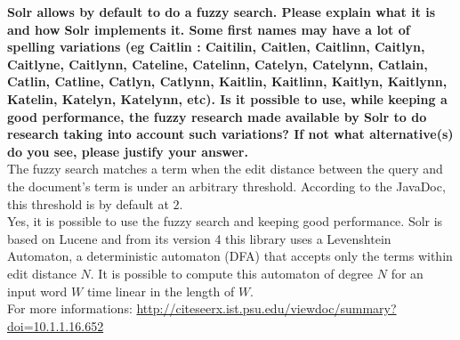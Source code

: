 \documentclass[a4paper]{article}
\begin{document}
\textbf{Solr allows by default to do a fuzzy search. Please explain what it is and how Solr implements it. Some first names may have a lot of spelling variations (eg Caitlin : Caitilin, Caitlen, Caitlinn, Caitlyn, Caitlyne, Caitlynn, Cateline, Catelinn, Catelyn, Catelynn, Catlain, Catlin, Catline, Catlyn, Catlynn, Kaitlin, Kaitlinn, Kaitlyn, Kaitlynn, Katelin, Katelyn, Katelynn, etc). Is it possible to use, while keeping a good performance, the fuzzy research made available by Solr to do research taking into account such variations? If not what alternative(s) do you see, please justify your answer.} \\

The fuzzy search matches a term when the edit distance between the query and the document's term is under an arbitrary threshold. According to the JavaDoc, this threshold is by default at $2$. \\

Yes, it is possible to use the fuzzy search and keeping good performance. Solr is based on Lucene and from its version 4 this library uses a Levenshtein Automaton, a deterministic automaton (DFA) that accepts only the terms within edit distance $N$. It is possible to compute this automaton of degree $N$ for an input word $W$ time linear in the length of $W$. \\

For more informations: \url{http://citeseerx.ist.psu.edu/viewdoc/summary?doi=10.1.1.16.652} 
\end{document}
